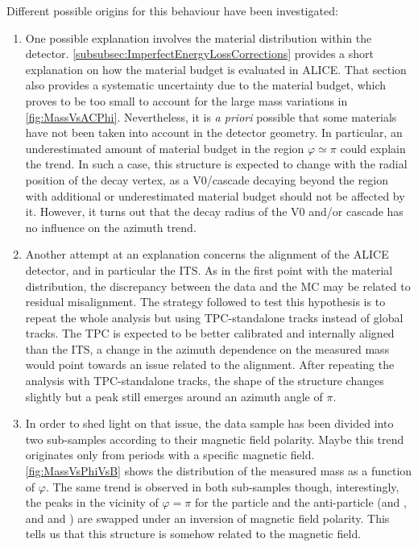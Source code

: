 Different possible origins for this  behaviour have been investigated:
\begin{enumerate}
\item One possible explanation involves the material distribution within the detector. \Sec\ref{subsubsec:ImperfectEnergyLossCorrections} provides a short explanation on how the material budget is evaluated in ALICE. That section also provides a systematic uncertainty due to the material budget, which proves to be too small to account for the large mass variations in \figs\ref{fig:MassVsACPhi}. Nevertheless, it is \textit{a priori} possible that some materials have not been taken into account in the detector geometry. In particular, an underestimated amount of material budget in the region $\varphi \simeq \pi$ could explain the trend. In such a case, this structure is expected to change with the radial position of the decay vertex, as a V0/cascade decaying beyond the region with additional or underestimated material budget should not be affected by it. However, it turns out that the decay radius of the V0 and/or cascade has no influence on the azimuth trend.
\item Another attempt at an explanation concerns the alignment of the ALICE detector, and in particular the ITS. As in the first point with the material distribution, the discrepancy between the data and the MC may be related to residual misalignment. The strategy followed to test this hypothesis is to repeat the whole analysis but using TPC-standalone tracks instead of global tracks. The TPC is expected to be better calibrated and internally aligned than the ITS, a change in the azimuth dependence on the measured mass would point towards an issue related to the alignment. After repeating the analysis with TPC-standalone tracks, the shape of the structure changes slightly but a peak still emerges around an azimuth angle of $\pi$.
\item In order to shed light on that issue, the data sample has been divided into two sub-samples according to their magnetic field polarity. Maybe this trend originates only from periods with a specific magnetic field. \Fig\ref{fig:MassVsPhiVsB} shows the distribution of the measured mass as a function of $\varphi$. The same trend is observed in both sub-samples though, interestingly, the peaks in the vicinity of $\varphi = \pi$  for the particle and the anti-particle (\rmLambda and \rmAlambda, and \rmXiM and \rmAxiP) are swapped under an inversion of magnetic field polarity. This tells us that this structure is somehow related to the magnetic field.

\end{enumerate}

